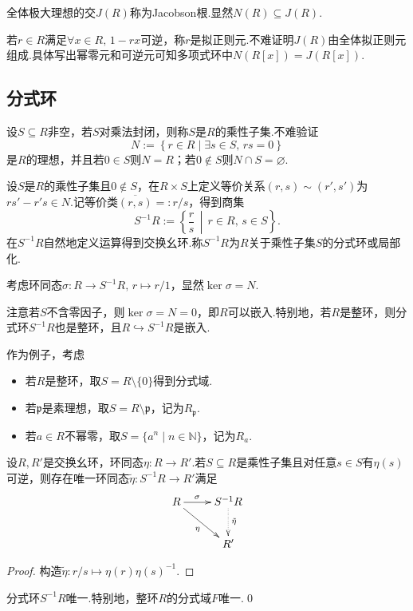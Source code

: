 全体极大理想的交$J(R)$称为{\heiti Jacobson根}.显然$N(R)\subseteq J(R)$.

若$r\in R$满足$\forall x\in R,\,1-rx$可逆，称$r$是{\heiti 拟正则元}.不难证明$J(R)$由全体拟正则元组成.具体写出幂零元和可逆元可知多项式环中$N(R[x])=J(R[x])$.

\subsection{分式环}
设$S\subseteq R$非空，若$S$对乘法封闭，则称$S$是$R$的{\heiti 乘性子集}.不难验证
\[
    N:=\left\{r\in R\mid \exists s\in S,\,rs=0\right\}
\]
是$R$的理想，并且若$0\in S$则$N=R$；若$0\notin S$则$N\cap S=\varnothing$.

设$S$是$R$的乘性子集且$0\notin S$，在$R\times S$上定义等价关系$(r,s)\sim(r',s')$为$rs'-r's\in N$.记等价类$\overline{(r,s)}=:r/s$，得到商集
\[
    S^{-1}R:=\left\{\frac{r}{s}\,\middle|\, r\in R,\,s\in S\right\}.
\]
在$S^{-1}R$自然地定义运算得到交换幺环.称$S^{-1}R$为$R$关于乘性子集$S$的{\heiti 分式环}或{\heiti 局部化}.

考虑环同态$\sigma\colon R\to S^{-1}R,\,r\mapsto r/1$，显然$\ker\sigma=N$.

注意若$S$不含零因子，则$\ker\sigma=N=0$，即$R$可以嵌入.特别地，若$R$是整环，则分式环$S^{-1}R$也是整环，且$R\hookrightarrow S^{-1}R$是嵌入.

作为例子，考虑
\begin{itemize}
    \item 若$R$是整环，取$S=R\setminus\{0\}$得到{\heiti 分式域}.
    \item 若$\mathfrak{p}$是素理想，取$S=R\setminus\mathfrak{p}$，记为$R_{\mathfrak{p}}$.
    \item 若$a\in R$不幂零，取$S=\{a^n\mid n\in\mathbb{N}\}$，记为$R_a$.
\end{itemize}

\begin{prop}
    设$R,R'$是交换幺环，环同态$\eta\colon R\to R'$.若$S\subseteq R$是乘性子集且对任意$s\in S$有$\eta(s)$可逆，则存在唯一环同态$\tilde{\eta}\colon S^{-1}R\to R'$满足
    \[
        \xymatrix{
        R\ar[r]^(0.4)\sigma\ar[rd]_\eta&S^{-1}R\ar@{.>}[d]^(0.45){\tilde{\eta}}\\
        &R'
        }
    \]
\end{prop}
\begin{proof}
    构造$\tilde{\eta}\colon r/s\mapsto \eta(r)\eta(s)^{-1}$.
\end{proof}
\begin{cor*}
    分式环$S^{-1}R$唯一.特别地，整环$R$的分式域$F$唯一.\qed
\end{cor*}

